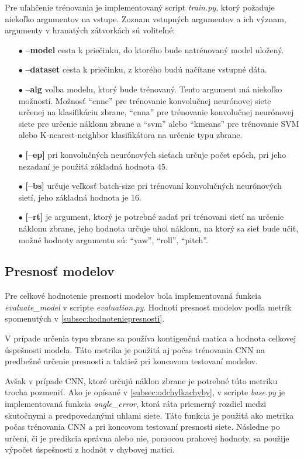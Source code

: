 Pre uľahčenie trénovania je implementovaný script \textit{train.py}, ktorý požaduje niekoľko argumentov na vstupe.
Zoznam vstupných argumentov a ich význam, argumenty v hranatých zátvorkách sú voliteľné:
\begin{enumerate}
    \item[$\bullet$] \textbf{--model} cesta k priečinku, do ktorého bude natrénovaný model uložený.
    \item[$\bullet$] \textbf{--dataset} cesta k priečinku, z ktorého budú načítane vstupné dáta.
    \item[$\bullet$] \textbf{--alg} voľba modelu, ktorý bude trénovaný. Tento argument má niekoľko možností.
    Možnosť ``cnnc'' pre trénovanie konvolučnej neurónovej siete určenej na klasifikáciu zbrane,
    ``cnna'' pre trénovanie konvolučnej neurónovej siete pre určenie náklonu zbrane a
    ``svm'' alebo ``kmeans'' pre trénovanie SVM alebo K-nearest-neighbor klasifikátora na určenie typu zbrane.
    \item[$\bullet$] \textbf{[--ep]} pri konvolučných neurónových sieťach určuje počet epóch, pri jeho nezadaní je použitá
    základná hodnota 45.
    \item[$\bullet$] \textbf{[--bs]} určuje veľkosť batch-size pri trénovaní konvolučných neurónových sietí, jeho
    základná hodnota je 16.
    \item[$\bullet$] \textbf{[--rt]} je argument, ktorý je potrebné zadať pri trénovani sietí na určenie náklonu zbrane,
    jeho hodnota určuje uhol náklonu, na ktorý sa sieť bude učiť, možné hodnoty argumentu sú: ``yaw'', ``roll'', ``pitch''.
\end{enumerate}

\subsection{Presnosť modelov}
\label{subsec:presnostmodelov}
Pre celkové hodnotenie presnosti modelov bola implementovaná funkcia \textit{evaluate\_model} v scripte \textit{evaluation.py}.
Hodnotí presnosť modelov podľa metrík spomenutých v \ref{subsec:hodnoteniepresnosti}.

V prípade určenia typu zbrane sa používa kontigenčná matica a hodnota celkovej úspešnosti modela.
Táto metrika je použitá aj počas trénovania CNN na predbežné určenie presnosti a taktiež pri koncovom testovaní modelov.

Avšak v prípade CNN, ktoré určujú náklon zbrane je potrebné túto metriku trocha pozmeniť.
Ako je opísané v \ref{subsec:odchylkachyby}, v scripte \textit{base.py} je implementovaná funkcia \textit{angle\_error}, ktorá ráta priemerný rozdiel medzi
    skutočnymi a predpovedanými uhlami siete.
Táto funkcia je použitá ako metrika počas trénovania CNN a pri koncovom testovaní presnosti siete.
Následne po určení, či je predikcia správna alebo nie, pomocou prahovej hodnoty, sa použije výpočet úspešnosti z hodnôt v chybovej matici.
